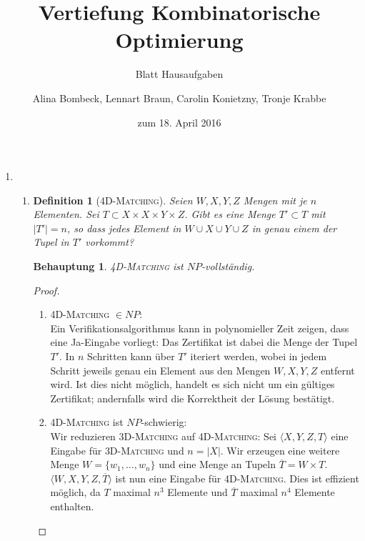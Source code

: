 \documentclass[a4paper]{scrartcl}
\title{Vertiefung Kombinatorische Optimierung}
\subtitle{Blatt {\blattnr} Hausaufgaben}
\author{%
    Alina Bombeck,
    Lennart Braun,
    Carolin Konietzny,
    Tronje Krabbe
}
\date{zum 18. April 2016}
\newtheorem*{proposition}{Behauptung}
\newtheorem*{definition}{Definition}
\begin{document}
\maketitle


\begin{enumerate}[label=\bfseries \arabic*.]
\item %
\begin{enumerate}
\item
    \begin{definition}[\textsc{4D-Matching}]
        Seien $W,X,Y,Z$ Mengen mit je $n$ Elementen.
        Sei $T \subset X \times X \times Y \times Z$.
        Gibt es eine Menge $T' \subset T$ mit $|T'| = n$, so dass jedes Element
        in $W \cup X \cup Y \cup Z$ in genau einem der Tupel in $T'$ vorkommt?
    \end{definition}
    \begin{proposition}
        \textsc{4D-Matching} ist $NP$-vollständig.
    \end{proposition}
    \begin{proof}
        \hfill \\
        \begin{enumerate}
            \item \textsc{4D-Matching} $\in NP$: \\
                Ein Verifikationsalgorithmus kann in polynomieller Zeit zeigen,
                dass eine Ja-Eingabe vorliegt: Das Zertifikat ist dabei die
                Menge der Tupel $T'$. In $n$ Schritten kann über $T'$ iteriert
                werden, wobei in jedem Schritt jeweils genau ein Element aus
                den Mengen $W,X,Y,Z$ entfernt wird. Ist dies nicht möglich,
                handelt es sich nicht um ein gültiges Zertifikat; andernfalls
                wird die Korrektheit der Lösung bestätigt.

            \item \textsc{4D-Matching} ist $NP$-schwierig: \\
                Wir reduzieren \textsc{3D-Matching} auf \textsc{4D-Matching}:
                Sei $\langle X,Y,Z,T \rangle$ eine Eingabe für
                \textsc{3D-Matching} und $n = |X|$.  Wir erzeugen eine weitere
                Menge $W = \{w_1, \dotsc, w_n\}$ und eine Menge an Tupeln
                $\overline{T} = W \times T$.  $\langle W,X,Y,Z,\overline{T}
                \rangle$ ist nun eine Eingabe für \textsc{4D-Matching}.
                Dies ist effizient möglich, da $T$ maximal $n^3$ Elemente und
                $\overline{T}$ maximal $n^4$ Elemente enthalten.


\end{enumerate}
\end{proof}
\end{enumerate}
\end{enumerate}
\end{document}
